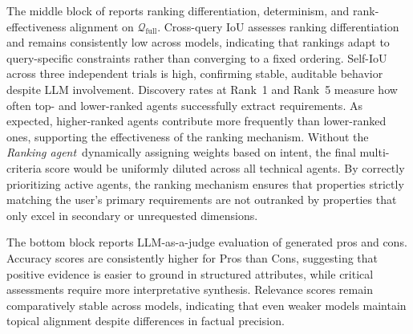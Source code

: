 \documentclass[runningheads,orivec]{llncs}
\newcommand{\rankingagent}{\textit{Ranking agent}}
\newcommand{\gptoss}{\texttt{gpt-oss-120b}}
\newcommand{\gemma}{\texttt{gemma3-27b}}
\newcommand{\qwen}{\texttt{qwen3-8b}}
\newcommand{\combqueries}{$\mathcal{Q}_\text{comb}$}
\begin{document}
The middle block of  reports ranking differentiation, determinism, and rank-effectiveness alignment on $\mathcal{Q}_{\mathrm{full}}$. Cross-query IoU assesses ranking differentiation and remains consistently low across models, indicating that rankings adapt to query-specific constraints rather than converging to a fixed ordering. Self-IoU across three independent trials is high, confirming stable, auditable behavior despite LLM involvement.
Discovery rates at Rank~1 and Rank~5 measure how often top- and lower-ranked agents successfully extract requirements. As expected, higher-ranked agents contribute more frequently than lower-ranked ones, supporting the effectiveness of the ranking mechanism. Without the \rankingagent\ dynamically assigning weights based on intent, the final multi-criteria score would be uniformly diluted across all technical agents. By correctly prioritizing active agents, the ranking mechanism ensures that properties strictly matching the user's primary requirements are not outranked by properties that only excel in secondary or unrequested dimensions.

The bottom block reports LLM-as-a-judge evaluation of generated pros and cons. Accuracy scores are consistently higher for Pros than Cons, suggesting that positive evidence is easier to ground in structured attributes, while critical assessments require more interpretative synthesis. Relevance scores remain comparatively stable across models, indicating that even weaker models maintain topical alignment despite differences in factual precision.




\end{document}
